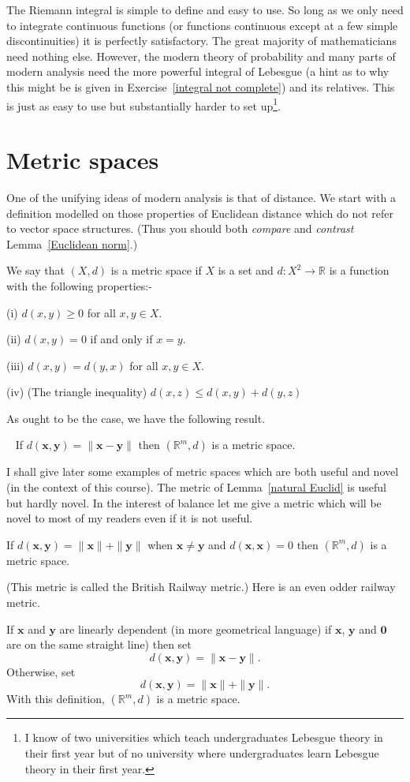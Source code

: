 The Riemann integral is simple to define and easy to
use. So long as we only need to integrate continuous
functions (or functions continuous except at a few
simple discontinuities) it is perfectly satisfactory.
The great majority of mathematicians need nothing
else. However, the modern theory of probability
and many parts of modern analysis need the
more powerful integral of Lebesgue
(a hint as to why this might be is given
in Exercise~\ref{integral not complete}) and
its relatives. This is just as easy to use but
substantially harder to set up\footnote{I know
of two universities which teach undergraduates
Lebesgue theory in their
first year but of no university where
undergraduates learn Lebesgue theory in their
first year.}.
\section{Metric spaces}\label{section metric}
One of the unifying ideas
of modern analysis is that of distance.
We start with a definition modelled on those
properties of Euclidean distance which do not
refer to vector space structures. (Thus you
should both \emph{compare} and \emph{contrast}
Lemma~\ref{Euclidean norm}.)
\begin{definition}\label{metric}
We say that $(X,d)$ is a metric space if $X$ is
a set and $d:X^{2}\rightarrow\mathbb{R}$ is a function with the
following properties:-

(i) $d(x,y)\geq 0$ for all $x,y\in X$.

(ii) $d(x,y)=0$ if and only if $x=y$.

(iii) $d(x,y)=d(y,x)$ for all $x,y\in X$.

(iv) (The triangle inequality)
$d(x,z)\leq d(x,y)+d(y,z)$
\end{definition}
As ought to be the case, we have the following result.
\begin{lemma}~\label{natural Euclid}
If $d({\mathbf x},{\mathbf y})=\|{\mathbf x}-{\mathbf y}\|$
then $({\mathbb R}^{m},d)$ is a metric space.
\end{lemma}
I shall give later some examples of metric spaces which are
both useful and novel (in the context of this course).
The metric of Lemma~\ref{natural Euclid} is useful
but hardly novel. In the interest of balance 
let me give a metric which will be novel to most
of my readers even if it is not useful.
\begin{example}\label{Railway 1}
If 
$d({\mathbf x},{\mathbf y})=\|{\mathbf x}\|+\|{\mathbf y}\|$
when $\mathbf{x}\neq \mathbf{y}$ and 
$d({\mathbf x},{\mathbf x})=0$ then 
$({\mathbb R}^{m},d)$ is a metric space.
\end{example}
(This metric is called the British Railway metric.)
Here is an even odder railway metric.
\begin{example}\label{Railway 2}
If
${\mathbf x}$ and ${\mathbf y}$ are linearly dependent
(in more geometrical language) if 
${\mathbf x}$, ${\mathbf y}$ and ${\mathbf 0}$
are on the same straight line) then set
\[d({\mathbf x},{\mathbf y})=\|{\mathbf x}-{\mathbf y}\|.\]
Otherwise, set
\[d({\mathbf x},{\mathbf y})=\|{\mathbf x}\|+\|{\mathbf y}\|.\]
With this definition,
$({\mathbb R}^{m},d)$ is a metric space.
\end{example}

